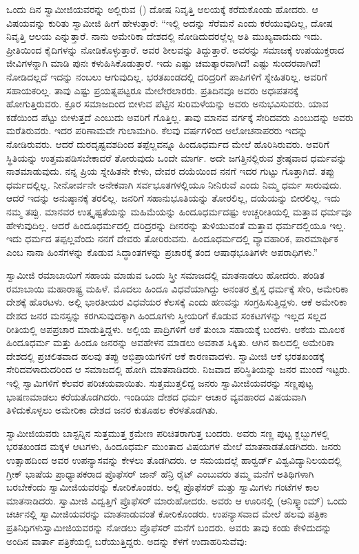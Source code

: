 ಒಂದು ದಿನ ಸ್ವಾಮೀಜಿಯವರನ್ನು ಅಲ್ಲಿರುವ () ದೋಷ ನಿವೃತ್ತಿ ಆಲಯಕ್ಕೆ ಕರೆದುಕೊಂಡು ಹೋದರು. ಆ ವಿಷಯವನ್ನು ಕುರಿತು ಸ್ವಾಮೀಜಿ ಹೀಗೆ ಹೇಳುತ್ತಾರೆ: “ಇಲ್ಲಿ ಅದನ್ನು ಸೆರೆಮನೆ ಎಂದು ಕರೆಯುವುದಿಲ್ಲ, ದೋಷ ನಿವೃತ್ತಿ ಆಲಯ ಎನ್ನುತ್ತಾರೆ. ನಾನು ಅಮೇರಿಕಾ ದೇಶದಲ್ಲಿ ನೋಡಿದುದರಲ್ಲೆಲ್ಲ ಅತಿ ಮುಖ್ಯವಾದುದು ಇದು. ಪ್ರೀತಿಯಿಂದ ಕೈದಿಗಳನ್ನು ನೋಡಿಕೊಳ್ಳುತ್ತಾರೆ. ಅವರ ಶೀಲವನ್ನು ತಿದ್ದುತ್ತಾರೆ. ಅವರನ್ನು ಸಮಾಜಕ್ಕೆ ಉಪಯುಕ್ತರಾದ ಜೀವಿಗಳನ್ನಾಗಿ ಮಾಡಿ ಪುನಃ ಕಳುಹಿಸಿಕೊಡುತ್ತಾರೆ. ಇದು ಎಷ್ಟು ಚಮತ್ಕಾರವಾಗಿದೆ! ಎಷ್ಟು ಸುಂದರವಾಗಿದೆ! ನೋಡಿದಲ್ಲದೆ ಇದನ್ನು ನಂಬಲು ಆಗುವುದಿಲ್ಲ. ಭರತಖಂಡದಲ್ಲಿ ದರಿದ್ರರಿಗೆ ಪಾಪಿಗಳಿಗೆ ಸ್ನೇಹಿತರಿಲ್ಲ. ಅವರಿಗೆ ಸಹಾಯಕರಿಲ್ಲ. ತಾವು ಎಷ್ಟು ಪ್ರಯತ್ನಪಟ್ಟರೂ ಮೇಲೇರಲಾರರು. ಪ್ರತಿದಿನವೂ ಅವರು ಅಧಃಪತನಕ್ಕೆ ಹೋಗುತ್ತಿರುವರು. ಕ್ರೂರ ಸಮಾಜದಿಂದ ಬೀಳುವ ಪೆಟ್ಟಿನ ಸುರಿಮಳೆಯನ್ನು ಅವರು ಅನುಭವಿಸುವರು. ಯಾವ ಕಡೆಯಿಂದ ಪೆಟ್ಟು ಬೀಳುತ್ತದೆ ಎಂಬುದು ಅವರಿಗೆ ಗೊತ್ತಿಲ್ಲ. ತಾವು ಮಾನವ ವರ್ಗಕ್ಕೆ ಸೇರಿದವರು ಎಂಬುದನ್ನು ಅವರು ಮರೆತಿರುವರು. ಇದರ ಪರಿಣಾಮವೇ ಗುಲಾಮಗಿರಿ. ಕೆಲವು ವರ್ಷಗಳಿಂದ ಆಲೋಚನಾಪರರು ಇದನ್ನು ನೋಡಿರುವರು. ಆದರೆ ದುರದೃಷ್ಟವಶದಿಂದ ತಪ್ಪೆಲ್ಲವನ್ನೂ ಹಿಂದೂಧರ್ಮದ ಮೇಲೆ ಹೊರಿಸಿರುವರು. ಅವರಿಗೆ ಸ್ಥಿತಿಯನ್ನು ಉತ್ತಮಪಡಿಸಬೇಕಾದರೆ ತೋರುವುದು ಒಂದೇ ಮಾರ್ಗ. ಅದೇ ಜಗತ್ತಿನಲ್ಲಿರುವ ಶ್ರೇಷ್ಠವಾದ ಧರ್ಮವನ್ನು ನಾಶಮಾಡುವುದು. ನನ್ನ ಪ್ರಿಯ ಸ್ನೇಹಿತನೇ ಕೇಳು, ದೇವರ ದಯೆಯಿಂದ ನನಗೆ ಇದರ ಗುಟ್ಟು ಗೊತ್ತಾಗಿದೆ. ತಪ್ಪು ಧರ್ಮದಲ್ಲಿಲ್ಲ. ನೀನೋರ್ವನೇ ಅನೇಕವಾಗಿ ಸರ್ವಭೂತಗಳಲ್ಲಿಯೂ ನೀನಿರುವೆ ಎಂದು ನಿಮ್ಮ ಧರ್ಮ ಸಾರುವುದು. ಆದರೆ ಇದನ್ನು ಅನುಷ್ಠಾನಕ್ಕೆ ತರಲಿಲ್ಲ. ಜನರಿಗೆ ಸಹಾನುಭೂತಿಯನ್ನು ತೋರಲಿಲ್ಲ, ದಯೆಯನ್ನು ಬೀರಲಿಲ್ಲ. ಇದು ನಮ್ಮ ತಪ್ಪು. ಮಾನವರ ಉತ್ಕೃಷ್ಟತೆಯನ್ನು ಮಹಿಮೆಯನ್ನು ಹಿಂದೂಧರ್ಮದಷ್ಟು ಉಚ್ಚರೀತಿಯಲ್ಲಿ ಮತ್ತಾವ ಧರ್ಮವೂ ಹೇಳುವುದಿಲ್ಲ. ಆದರೆ ಹಿಂದೂಧರ್ಮದಲ್ಲಿ ದರಿದ್ರರನ್ನು ದೀನರನ್ನು ತುಳಿಯುವಂತೆ ಮತ್ತಾವ ಧರ್ಮದಲ್ಲಿಯೂ ಇಲ್ಲ. ಇದು ಧರ್ಮದ ತಪ್ಪಲ್ಲವೆಂದು ನನಗೆ ದೇವರು ತೋರಿರುವನು. ಹಿಂದೂಧರ್ಮದಲ್ಲಿ ವ್ಯಾವಹಾರಿಕ, ಪಾರಮಾರ್ಥಿಕ ಎಂಬ ನಾನಾ ಹಿಂಸೆಗಳನ್ನು ಕೊಡುವ ಸಿದ್ಧಾಂತಗಳನ್ನು ಪ್ರಚಾರಕ್ಕೆ ತಂದ ಆಷಾಢಭೂತಿಗಳೇ ಅಪರಾಧಿಗಳು.” 

 ಸ್ವಾಮೀಜಿ ರಮಾಬಾಯಿಗೆ ಸಹಾಯ ಮಾಡುವ ಒಂದು ಸ್ತ್ರೀ ಸಮಾಜದಲ್ಲಿ ಮಾತನಾಡಲು ಹೋದರು. ಪಂಡಿತ ರಮಾಬಾಯಿ ಮಹಾರಾಷ್ಟ್ರ ಮಹಿಳೆ. ಮೊದಲು ಹಿಂದೂ ವಿಧವೆಯಾಗಿದ್ದು ಅನಂತರ ಕ್ರೈಸ್ತ ಧರ್ಮಕ್ಕೆ ಸೇರಿ, ಅಮೇರಿಕಾ ದೇಶಕ್ಕೆ ಹೊರಟಳು. ಅಲ್ಲಿ ಭಾರತೀಯರ ವಿಧವೆಯರ ಕೆಲಸಕ್ಕೆ ಎಂದು ಹಣವನ್ನು ಸಂಗ್ರಹಿಸುತ್ತಿದ್ದಳು. ಆಕೆ ಅಮೇರಿಕಾ ದೇಶದ ಜನರ ಮನಸ್ಸನ್ನು ಕರಗಿಸುವುದಕ್ಕಾಗಿ ಹಿಂದೂಗಳು ಸ್ತ್ರೀಯರಿಗೆ ಕೊಡುವ ಸಂಕಟಗಳನ್ನು ಇಲ್ಲದ ಸಲ್ಲದ ರೀತಿಯಲ್ಲಿ ಅಪಪ್ರಚಾರ ಮಾಡುತ್ತಿದ್ದಳು. ಅಲ್ಲಿಯ ಪಾದ್ರಿಗಳಿಗೆ ಆಕೆ ತುಂಬಾ ಸಹಾಯಕ್ಕೆ ಬಂದಳು. ಆಕೆಯ ಮೂಲಕ ಹಿಂದೂಧರ್ಮ ಮತ್ತು ಹಿಂದೂ ಜನರನ್ನು ಅವಹೇಳನ ಮಾಡಲು ಅವಕಾಶ ಸಿಕ್ಕಿತು. ಆಗಿನ ಕಾಲದಲ್ಲಿ ಅಮೇರಿಕಾ ದೇಶದಲ್ಲಿ ಪ್ರಚಲಿತವಾದ ಹಲವು ತಪ್ಪು ಅಭಿಪ್ರಾಯಗಳಿಗೆ ಆಕೆ ಕಾರಣವಾದಳು. ಸ್ವಾಮೀಜಿ ಆಕೆ ಭರತಖಂಡಕ್ಕೆ ಸೇರಿದವಳಾದುದರಿಂದ ಆ ಸಮಾಜದಲ್ಲಿ ಹೋಗಿ ಮಾತನಾಡಿದರು. ನಿಜವಾದ ಪರಿಸ್ಥಿತಿಯನ್ನು ಜನರ ಮುಂದೆ ಇಟ್ಟರು. ಇಲ್ಲಿ ಸ್ವಾಮಿಗಳಿಗೆ ಕೆಲವರ ಪರಿಚಯವಾಯಿತು. ಸುತ್ತಮುತ್ತಲಿದ್ದ ಜನರು ಸ್ವಾಮೀಜಿಯವರನ್ನು ಸಣ್ಣಪುಟ್ಟ ಭಾಷಣಮಾಡಲು ಕರೆಯತೊಡಗಿದರು. ಇಂಡಿಯಾ ದೇಶದ ಧರ್ಮ ಆಚಾರ ವ್ಯವಹಾರದ ವಿಷಯವಾಗಿ ತಿಳಿದುಕೊಳ್ಳಲು ಅಮೇರಿಕಾ ದೇಶದ ಜನರ ಕುತೂಹಲ ಕೆರಳತೊಡಗಿತು. 

 ಸ್ವಾಮೀಜಿಯವರು ಬಾಸ್ಟನ್ನಿನ ಸುತ್ತಮುತ್ತ ಕ್ರಮೇಣ ಪರಿಚಿತರಾಗುತ್ತ ಬಂದರು. ಅವರು ಸಣ್ಣ ಪುಟ್ಟ ಕ್ಲಬ್ಬುಗಳಲ್ಲಿ ಭರತಖಂಡದ ಮಕ್ಕಳ ಆಟಗಳು, ಹಿಂದೂಧರ್ಮ ಮುಂತಾದ ವಿಷಯಗಳ ಮೇಲೆ ಮಾತನಾಡತೊಡಗಿದರು. ಜನರು ಉತ್ಸಾಹದಿಂದ ಅವರ ಉಪನ್ಯಾಸವನ್ನು ಕೇಳಲು ತೊಡಗಿದರು. ಆ ಸಮಯದಲ್ಲೆ ಹಾರ್‍ವರ್ಡ್ ವಿಶ್ವವಿದ್ಯಾನಿಲಯದಲ್ಲಿ ಗ್ರೀಕ್ ಭಾಷೆಯ ಪ್ರಾಧ್ಯಾಪಕರಾದ ಪ್ರೊಫೆಸರ್ ಜಾನ್ ಹೆನ್ರಿ ರೈಟ್ ಎಂಬುವರು ತಮ್ಮ ಮನೆಗೆ ಅತಿಥಿಗಳಾಗಿ ಬರಬೇಕೆಂದು ಸ್ವಾಮೀಜಿಯವರನ್ನು ಕೋರಿಕೊಂಡರು. ಅಲ್ಲಿ ಪ್ರೊಫೆಸರ್ ಮತ್ತು ಸ್ವಾಮಿಗಳು ಗಂಟೆಗಳ ಕಾಲ ಮಾತನಾಡಿದರು. ಸ್ವಾಮೀಜಿ ವಿದ್ವತ್ತಿಗೆ ಪ್ರೊಫೆಸರ್ ಮಾರುಹೋದರು. ಅವರು ಆ ಊರಿನಲ್ಲಿ (ಆನಿಸ್ಕ್ವಾಂಮ್) ಒಂದು ಚರ್ಚಿನಲ್ಲಿ ಸ್ವಾಮೀಜಿಯವರನ್ನು ಮಾತನಾಡುವಂತೆ ಕೋರಿಕೊಂಡರು. ಉಪನ್ಯಾಸವಾದ ಮೇಲೆ ಹಲವು ಪತ್ರಿಕಾ ಪ್ರತಿನಿಧಿಗಳು\break ಸ್ವಾಮೀಜಿಯವರನ್ನು ನೋಡಲು ಪ್ರೊಫೆಸರ್ ಮನೆಗೆ ಬಂದರು. ಅವರು ತಾವು ಕಂಡು ಕೇಳಿದುದನ್ನು ಅಂದಿನ ವಾರ್ತಾ ಪತ್ರಿಕೆಯಲ್ಲಿ ಬರೆಯುತ್ತಿದ್ದರು. ಅದನ್ನು ಕೆಳಗೆ ಉದಾಹರಿಸುವೆವು: 


